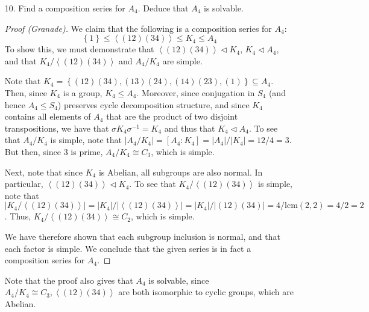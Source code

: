 \documentclass[10pt]{article}
\begin{document}
\begin{itemize}
\item [10.] Find a composition series for $A_{4}$. Deduce that $A_{4}$
is solvable.

\begin{proof}[Proof (Granade)]
We claim that the following is a composition series for $A_{4}$:\[
\left\{ 1\right\} \le\left\langle \left(12\right)\left(34\right)\right\rangle \le K_{4}\le A_{4}\]
To show this, we must demonstrate that $\left\langle \left(12\right)\left(34\right)\right\rangle \lhd K_{4}$,
$K_{4}\lhd A_{4}$, and that $K_{4}/\left\langle \left(12\right)\left(34\right)\right\rangle $
and $A_{4}/K_{4}$ are simple.

Note that $K_{4}=\left\{ \left(12\right)\left(34\right),\left(13\right)\left(24\right),\left(14\right)\left(23\right),\left(1\right)\right\} \subseteq A_{4}$.
Then, since $K_{4}$ is a group, $K_{4}\le A_{4}$. Moreover, since
conjugation in $S_{4}$ (and hence $A_{4}\le S_{4}$) preserves cycle
decomposition structure, and since $K_{4}$ contains all elements
of $A_{4}$ that are the product of two disjoint transpositions, we
have that $\sigma K_{4}\sigma^{-1}=K_{4}$ and thus that $K_{4}\lhd A_{4}$.
To see that $A_{4}/K_{4}$ is simple, note that $\left|A_{4}/K_{4}\right|=\left[A_{4}:K_{4}\right]=\left|A_{4}\right|/\left|K_{4}\right|=12/4=3$.
But then, since $3$ is prime, $A_{4}/K_{4}\cong C_{3}$, which is
simple.

Next, note that since $K_{4}$ is Abelian, all subgroups are also
normal. In particular, $\left\langle \left(12\right)\left(34\right)\right\rangle \lhd K_{4}$.
To see that $K_{4}/\left\langle \left(12\right)\left(34\right)\right\rangle $
is simple, note that $\left|K_{4}/\left\langle \left(12\right)\left(34\right)\right\rangle \right|=\left|K_{4}\right|/\left|\left\langle \left(12\right)\left(34\right)\right\rangle \right|=\left|K_{4}\right|/\left|\left(12\right)\left(34\right)\right|=4/\text{lcm}\left(2,2\right)=4/2=2$.
Thus, $K_{4}/\left\langle \left(12\right)\left(34\right)\right\rangle \cong C_{2}$,
which is simple.

We have therefore shown that each subgroup inclusion is normal, and
that each factor is simple. We conclude that the given series is in
fact a composition series for $A_{4}$.
\end{proof}

Note that the proof also gives that $A_{4}$ is solvable, since $A_4/K_4 \cong C_3, \left\langle \left(12\right)\left(34\right)\right\rangle $
are both isomorphic to cyclic groups, which are Abelian.



\end{itemize}
\end{document}
